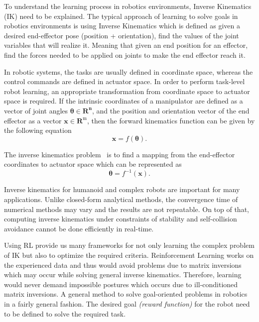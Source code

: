To understand the learning process in robotics environments, Inverse Kinematics (IK) need to be explained. The typical approach of learning to solve goals in robotics environments is using Inverse Kinematics which is defined as given a desired end-effector pose (position + orientation), find the values of the joint variables that will realize it. Meaning that given an end position for an effector, find the forces needed to be applied on joints to make the end effector reach it.

In robotic systems, the tasks are usually defined in coordinate space, whereas the control commands are defined in actuator space. In order to perform task-level robot learning, an appropriate transformation from coordinate space to actuator space is required. If the intrinsic coordinates of a manipulator are defined as a vector of joint angles \(\boldsymbol{\theta} \in \mathbf{R}^{\mathbf{n}}\), and the position and orientation vector of the end effector as a vector \(\mathbf{x} \in \mathbf{R}^{\mathrm{m}}\), then the forward kinematics function can be given by the following equation 
\begin{equation}
	        \mathbf{x}=f(\boldsymbol{\theta}).
\end{equation}

The inverse kinematics problem~\parencite{colome2011smooth, chua2013robust} is to find a mapping from the end-effector coordinates to actuator space which can be represented as
\begin{equation}
	        \boldsymbol{\theta}=f^{-1}(\mathbf{x}).
\end{equation}

Inverse kinematics for humanoid and complex robots are important for many applications. Unlike closed-form analytical methods, the convergence time of numerical methods may vary and the results are not repeatable. On top of that, computing inverse kinematics under constraints of stability and self-collision avoidance cannot be done efficiently in real-time.

Using RL provide us many frameworks for not only learning the complex problem of IK but also to optimize the required criteria. Reinforcement Learning works on the experienced data and thus would avoid problems due to matrix inversions which may occur while solving general inverse kinematics. Therefore, learning would never demand impossible postures which occurs due to ill-conditioned matrix inversions. A general method to solve goal-oriented problems in robotics in a fairly general fashion. The desired goal \textit{(reward function)} for the robot need to be defined to solve the required task.

